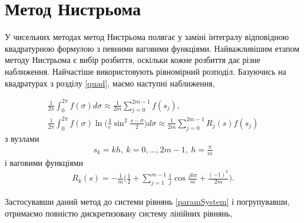 \documentclass[12pt]{report}
\begin{document}
 \section{Метод Нистрьома}
 
 У чисельних методах метод Нистрьома полягає у заміні інтегралу відповідною квадратурною формулою з певними ваговими функціями. Найважливішим етапом методу Нистрьома є вибір розбиття, оскільки кожне розбиття дає різне наближення. Найчастіше використовують рівномірний розподіл. Базуючись на квадратурах з розділу \eqref{quad}, маємо наступні наближення,
  
 \begin{gather}
 	\frac{1}{2\pi}\int_{0}^{2\pi}f(\sigma)d\sigma\approx\frac{1}{2m}\sum_{j=0}^{2m-1}f(s_j), \\
	\frac{1}{2\pi}\int_{0}^{2\pi}f(\sigma)\ln\bigg(\frac{4}{e}\sin^2\frac{s-\sigma}{2}\bigg)d\sigma\approx\frac{1}{2m}\sum_{j=0}^{2m-1}R_j(s)f(s_j)
 \end{gather}
 з вузлами
 \begin{gather}
 	s_k=kh, \ k=0,...,2m-1, \ h=\frac{\pi}{m}
  \end{gather}
  і ваговими функціями
  \begin{gather}
 	R_k(s)=-\frac{1}{m}\bigg(\frac{1}{2}+\sum_{j=1}^{m-1}\frac{1}{j}\cos \frac{jk\pi}{m}+ \frac{(-1)^k}{2m}\bigg).
  \end{gather}
  
  Застосувавши даний метод до системи рівнянь \eqref{paramSystem} і погрупувавши, отримаємо повністю дискретизовану систему лінійних рівнянь,
  
\end{document}
